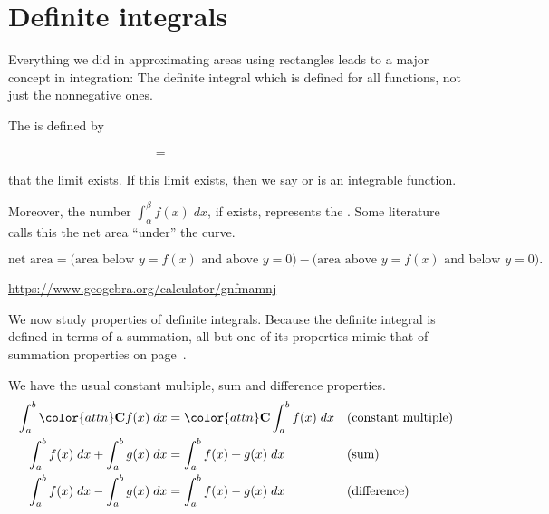 \documentclass[../main.tex]{subfiles}
\begin{document}
 \section{Definite integrals}
Everything we did in approximating areas using rectangles leads to a major concept in integration: The definite integral which is defined for all functions, not just the nonnegative ones.
\begin{mdframed}[style=withref-compact]
  The  is defined by 
  \begin{equation} \label{eq:definite-integral} 
    \phantom{\int_{\alpha}^{\beta} f(x) \;dx} = \hspace{3in}
  \end{equation}
   that the limit exists. If this limit exists, then we say  or is an integrable function. 

  Moreover, the number \(\int_{\alpha}^{\beta} f(x) \;dx\), if exists, represents the  . Some literature calls this the net area ``under'' the curve.
\end{mdframed}
\[
  \text{net area} = \bigg(\text{area below \(y = f(x)\) and above \(y = 0\)}\bigg) - \bigg(\text{area above \(y = f(x)\) and below \(y = 0\)}\bigg).
\]



\url{https://www.geogebra.org/calculator/gnfmamnj}


\bigskip
We now study properties of definite integrals. Because the definite integral is defined in terms of a summation, all but one of its properties mimic that of summation properties on page~\pageref{page:summation-properties}.

We have the usual constant multiple, sum and difference properties.
\begin{align*}
  \int_{a}^{b} {\color{attn} \mathbf{C}} f(x) \;dx &= {\color{attn} \mathbf{C}} \int_{a}^{b} f(x) \;dx && \text{(constant multiple)}\\
  \int_{a}^{b} f(x) \;dx + \int_{a}^{b} g(x) \;dx &= \int_{a}^{b} f(x) + g(x) \;dx && \text{(sum)} \\
  \int_{a}^{b} f(x) \;dx - \int_{a}^{b} g(x) \;dx &= \int_{a}^{b} f(x) - g(x) \;dx && \text{(difference)}
\end{align*}
\clearpage
\end{document}
